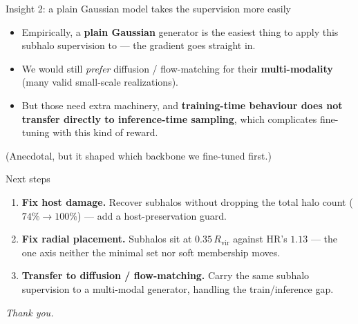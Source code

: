 \documentclass[aspectratio=169]{beamer}
\begin{document}
\begin{frame}{Insight 2: a plain Gaussian model takes the supervision more easily}
\small
\begin{itemize}
    \item Empirically, a \textbf{plain Gaussian} generator is the easiest thing
          to apply this subhalo supervision to --- the gradient goes straight in.
    \item We would still \emph{prefer} diffusion / flow-matching for their
          \textbf{multi-modality} (many valid small-scale realizations).
    \item But those need extra machinery, and \textbf{training-time behaviour
          does not transfer directly to inference-time sampling}, which
          complicates fine-tuning with this kind of reward.
\end{itemize}
\vspace{0.15cm}
{\footnotesize (Anecdotal, but it shaped which backbone we fine-tuned first.)}
\end{frame}


\begin{frame}{Next steps}
\small
\begin{enumerate}
    \item \textbf{Fix host damage.} Recover subhalos without dropping the
          total halo count ($74\%\to100\%$) --- add a host-preservation guard.
    \item \textbf{Fix radial placement.} Subhalos sit at $0.35\,R_{\mathrm{vir}}$
          against HR's $1.13$ --- the one axis neither the minimal set nor soft
          membership moves.
    \item \textbf{Transfer to diffusion / flow-matching.} Carry the same
          subhalo supervision to a multi-modal generator, handling the
          train/inference gap.
\end{enumerate}
\vspace{0.4cm}
\centering
\textit{Thank you.}
\end{frame}
\end{document}

